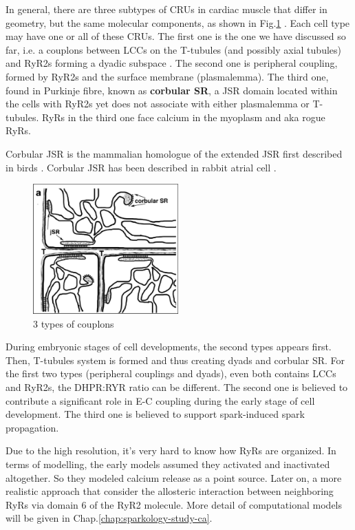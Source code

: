 In general, there are three subtypes of CRUs in cardiac muscle that differ in
geometry, but the same molecular components, as shown in
Fig.\ref{fig:couplons_3types} \citep{franzini_armstrong2005}. Each cell type may
have one or all of these CRUs. The first one is the one we have discussed so
far, i.e. a couplons between LCCs on the T-tubules (and possibly axial tubules)
and RyR2s forming a dyadic subspace \citep{asghari2009}. The second one is
peripheral coupling, formed by RyR2s and the surface membrane (plasmalemma).
The third one, found in Purkinje fibre, known as {\bf corbular SR}, a JSR
domain located within the cells with RyR2s yet does not associate with either
plasmalemma or T-tubules. RyRs in the third one face calcium in the myoplasm and
aka rogue RyRs.

\begin{framed}
Corbular JSR is the mammalian homologue of the extended JSR first described in
birds \citep{jewett1971}. Corbular JSR has been described in rabbit atrial cell
\citep{jorgensen1993}. 
\end{framed}

\begin{figure}[hbt]
  \centerline{\includegraphics[height=5cm,
    angle=0]{./images/couplons_3types.eps}}
\caption{3 types of couplons \citep{franzini_armstrong2005}}
\label{fig:couplons_3types}
\end{figure}

During embryonic stages of cell developments, the second types appears first.
Then, T-tubules system is formed and thus creating dyads and corbular SR. For
the first two types (peripheral couplings and dyads), even both contains LCCs
and RyR2s, the DHPR:RYR ratio can be different. The second one is
believed to contribute a significant role in E-C coupling during the early stage
of cell development. The third one is believed to support spark-induced
spark propagation.

Due to the high resolution, it's very hard to know how RyRs are organized. In
terms of modelling, the early models assumed they activated and inactivated
altogether. So they modeled calcium release as a point source. Later on, a more
realistic approach that consider the allosteric interaction between neighboring
RyRs via domain 6 of the RyR2 molecule. More detail of computational models will be given in
Chap.\ref{chap:sparkology-study-ca}. 

